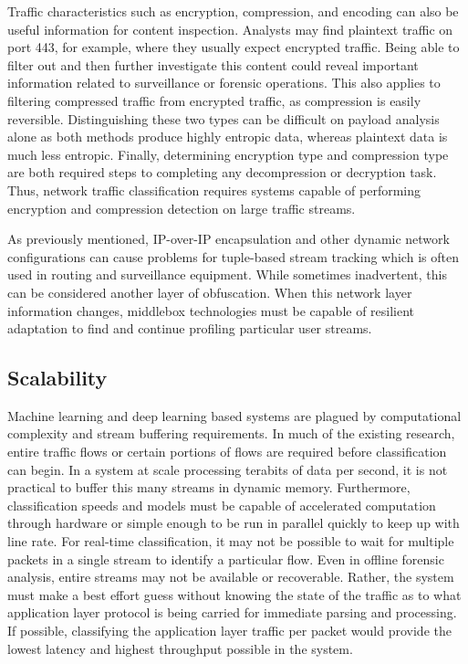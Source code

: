Traffic characteristics such as encryption, compression, and encoding can also be useful information for content inspection. Analysts may find plaintext traffic on port 443, for example, where they usually expect encrypted traffic. Being able to filter out and then further investigate this content could reveal important information related to surveillance or forensic operations. This also applies to filtering compressed traffic from encrypted traffic, as compression is easily reversible. Distinguishing these two types can be difficult on payload analysis alone as both methods produce highly entropic data, whereas plaintext data is much less entropic. Finally, determining encryption type and compression type are both required steps to completing any decompression or decryption task. Thus, network traffic classification requires systems capable of performing encryption and compression detection on large traffic streams.

As previously mentioned, IP-over-IP encapsulation and other dynamic network configurations can cause problems for tuple-based stream tracking which is often used in routing and surveillance equipment. While sometimes inadvertent, this can be considered another layer of obfuscation. When this network layer information changes, middlebox technologies must be capable of resilient adaptation to find and continue profiling particular user streams.

\subsection{Scalability}

Machine learning and deep learning based systems are plagued by computational complexity and stream buffering requirements. In much of the existing research, entire traffic flows or certain portions of flows are required before classification can begin. In a system at scale processing terabits of data per second, it is not practical to buffer this many streams in dynamic memory. Furthermore, classification speeds and models must be capable of accelerated computation through hardware or simple enough to be run in parallel quickly to keep up with line rate. For real-time classification, it may not be possible to wait for multiple packets in a single stream to identify a particular flow. Even in offline forensic analysis, entire streams may not be available or recoverable. Rather, the system must make a best effort guess without knowing the state of the traffic as to what application layer protocol is being carried for immediate parsing and processing. If possible, classifying the application layer traffic per packet would provide the lowest latency and highest throughput possible in the system.

